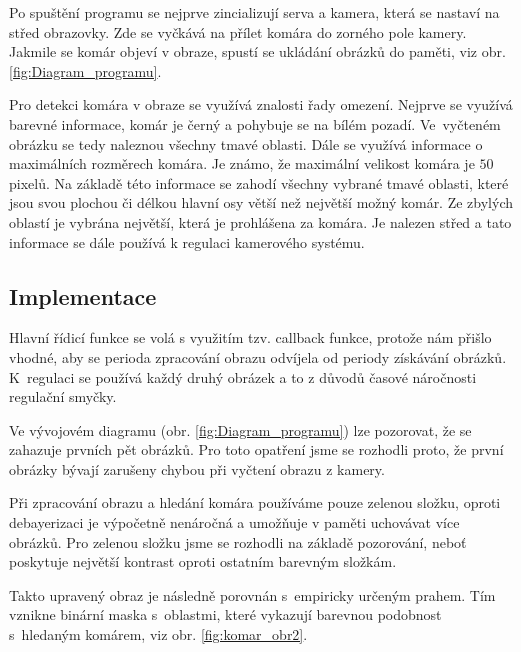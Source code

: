 \documentclass[a4paper,10pt]{article}
\begin{document}
		Po spuštění programu se nejprve zincializují serva a kamera, 
		která se nastaví na střed obrazovky.
		Zde se vyčkává na přílet komára do zorného pole kamery.
		Jakmile se komár objeví v obraze, spustí se ukládání obrázků do paměti, viz obr. \ref{fig:Diagram_programu}.

		Pro detekci komára v obraze se využívá znalosti řady omezení. 
		Nejprve se využívá barevné informace, komár je černý a pohybuje se na bílém pozadí.
		Ve~vyčteném obrázku se tedy naleznou všechny tmavé oblasti. 
		Dále se využívá informace o maximálních rozměrech komára. 
		Je známo, že maximální velikost komára je $50$ pixelů. 
		Na základě této informace se zahodí všechny vybrané tmavé oblasti, 
		které jsou svou plochou či délkou hlavní osy větší než největší možný komár.
		Ze zbylých oblastí je vybrána největší, která je prohlášena za komára.
		Je nalezen střed a tato informace se dále používá k regulaci kamerového systému.

\subsection{Implementace}

		Hlavní řídicí funkce se volá s využitím tzv. callback funkce, protože nám přišlo vhodné, 
		aby se perioda zpracování obrazu odvíjela od periody získávání obrázků.		
		K~regulaci se používá každý druhý obrázek a to z důvodů časové náročnosti regu\-lační smyčky.

		Ve vývojovém diagramu (obr. \ref{fig:Diagram_programu}) lze pozorovat, že se zahazuje prvních pět obrázků.
		Pro toto opatření jsme se rozhodli proto, 
		že první obrázky bývají zarušeny chybou při vyčtení obrazu z kamery.

		Při zpracování obrazu a hledání komára používáme pouze zelenou složku,
		oproti debayerizaci je výpočetně nenáročná a 
		umožňuje v paměti uchovávat více obrázků. Pro zelenou složku jsme se rozhodli na základě pozorování, 
		neboť poskytuje největší kontrast oproti ostatním barevným složkám.

		Takto upravený obraz je následně porovnán s~empiricky určeným prahem.
		Tím vznikne binární maska s~oblastmi, které vykazují barevnou podobnost s~hle\-da\-ným komárem, viz obr. \ref{fig:komar_obr2}.
\end{document}
